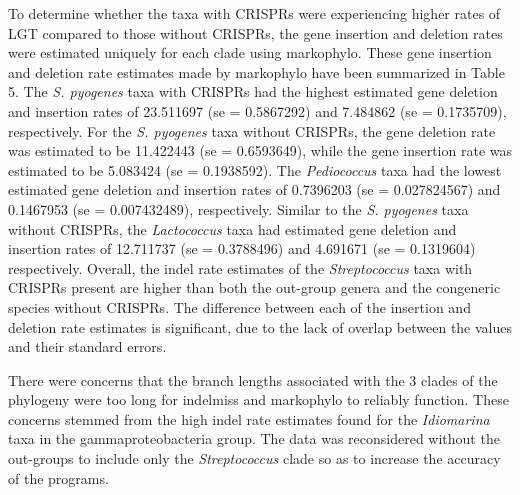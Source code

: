 \documentclass[english]{article}
\begin{document}
To determine  whether  the taxa  with CRISPRs  were experiencing
higher rates of LGT compared to those without CRISPRs,  the gene
insertion and deletion rates were estimated uniquely for each clade
using markophylo. These gene insertion and deletion rate estimates made
by markophylo have been summarized in Table 5. 
The \textit{S. pyogenes} taxa with CRISPRs had the 
highest
estimated gene deletion and insertion rates of 23.511697 (se =
0.5867292) and 7.484862  (se = 0.1735709), respectively. For the
\textit{S. pyogenes} taxa without  CRISPRs,  the gene deletion rate
 was estimated
to be 11.422443 (se = 0.6593649), while the gene insertion rate was
estimated  to be 5.083424 (se = 0.1938592). The \textit{Pediococcus} 
taxa had
the lowest estimated gene deletion and insertion rates of 0.7396203
(se = 0.027824567) and 0.1467953 (se = 0.007432489), respectively.
Similar to the \textit{S. pyogenes} taxa without CRISPRs, the
\textit{Lactococcus} taxa
had estimated gene deletion and insertion rates of 12.711737 (se =
0.3788496) and 4.691671 (se = 0.1319604) respectively.  Overall, the
indel rate estimates of the \textit{Streptococcus} taxa with CRISPRs present
are higher than both the out-group genera and the congeneric species
without CRISPRs. The difference
between each of the insertion and deletion rate  estimates  is significant,  
due to the  lack of overlap between the  values
and their standard errors. 

There were concerns that the  branch  lengths  associated  with  the
3 clades of the phylogeny were too long for indelmiss and markophylo
to reliably function. These concerns stemmed
from the high indel rate estimates found for the \textit{Idiomarina}
taxa in the gammaproteobacteria group.  The data was reconsidered without  the
out-groups  to include only the \textit{Streptococcus}  clade so as to 
increase the accuracy of the programs. 
\end{document}
